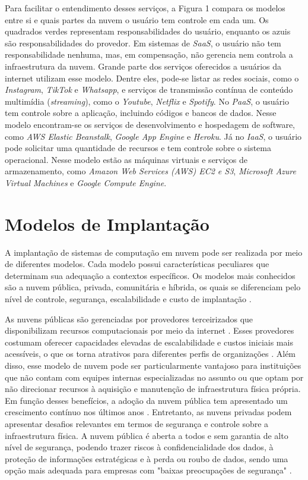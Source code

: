Para facilitar o entendimento desses serviços, a Figura 1 compara os modelos entre si e quais partes da nuvem o usuário tem controle em cada um. Os quadrados verdes representam responsabilidades do usuário, enquanto os azuis são responsabilidades do provedor. Em sistemas de \textit{SaaS}, o usuário não tem responsabilidade nenhuma, mas, em compensação, não gerencia nem controla a infraestrutura da nuvem. Grande parte dos serviços oferecidos a usuários da internet utilizam esse modelo. Dentre eles, pode-se listar as redes sociais, como o \textit{Instagram}, \textit{TikTok} e \textit{Whatsapp}, e serviços de transmissão contínua de conteúdo multimídia (\textit{streaming}), como o \textit{Youtube}, \textit{Netflix} e \textit{Spotify}.  No \textit{PaaS}, o usuário tem controle sobre a aplicação, incluindo códigos e bancos de dados. Nesse modelo encontram-se os serviços de desenvolvimento e hospedagem de software, como \textit{AWS Elastic Beanstalk}, \textit{Google App Engine} e \textit{Heroku}. Já no \textit{IaaS}, o usuário pode solicitar uma quantidade de recursos e tem controle sobre o sistema operacional. Nesse modelo estão as máquinas virtuais e serviços de armazenamento, como  \textit{Amazon Web Services (AWS) EC2 e S3},  \textit{Microsoft Azure Virtual Machines} e  \textit{Google Compute Engine}.

\section{Modelos de Implantação} 
A implantação de sistemas de computação em nuvem pode ser realizada por meio de diferentes modelos. Cada modelo possui características peculiares que determinam sua adequação a contextos específicos. Os modelos mais conhecidos são a nuvem pública, privada, comunitária e híbrida, os quais se diferenciam pelo nível de controle, segurança, escalabilidade e custo de implantação \cite{mell2011}.

As nuvens públicas são gerenciadas por provedores terceirizados que disponibilizam recursos computacionais por meio da internet \cite{carroll2011}. Esses provedores costumam oferecer capacidades elevadas de escalabilidade e custos iniciais mais acessíveis, o que os torna atrativos para diferentes perfis de organizações \cite{amajuoyi2024}. Além disso, esse modelo de nuvem pode ser particularmente vantajoso para instituições que não contam com equipes internas especializadas no assunto ou que optam por não direcionar recursos à aquisição e manutenção de infraestrutura física própria. Em função desses benefícios, a adoção da nuvem pública tem apresentado um crescimento contínuo nos últimos anos \cite{amajuoyi2024}. Entretanto, as nuvens privadas podem apresentar desafios relevantes em termos de segurança e controle sobre a infraestrutura física. A nuvem pública é aberta a todos e sem garantia de alto nível de segurança, podendo trazer riscos à confidencialidade dos dados, à proteção de informações estratégicas e à perda ou roubo de dados, sendo uma opção mais adequada para empresas com "baixas preocupações de segurança" \cite{sathya2023}.

